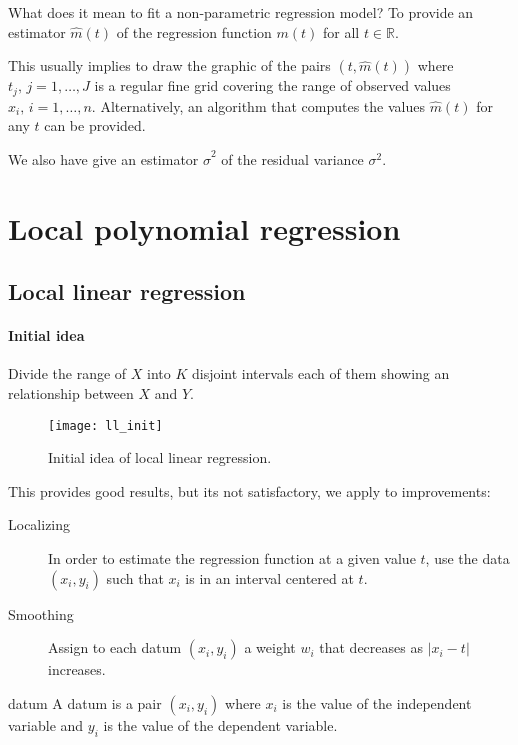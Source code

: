 \begin{question}{What does it mean to fit a non-parametric regression model?}{}
	To provide an estimator $\hat{m}(t)$ of the regression function $m(t)$ for
	all $t \in \mathbb{R}$.

	This usually implies to draw the graphic of the pairs $(t, \hat{m}(t))$ where
	$t_j,\, j=1,\ldots,J$ is a regular fine grid covering the range of observed values
	$x_i,\, i=1,\ldots,n$.
	Alternatively, an algorithm that computes the values $\hat{m}(t)$ for any $t$
	can be provided.

	We also have give an estimator $\hat\sigma^2$ of the residual variance $\sigma^2$.
\end{question}

\pagebreak
\section{Local polynomial regression}
\subsection{Local linear regression}

\paragraph{Initial idea} Divide the range of $X$ into $K$ disjoint intervals
each of them showing an  relationship between $X$ and $Y$.
\begin{figure}[H]
	\texttt{[image: ll\_init]}
	\caption{Initial idea of local linear regression.}
\end{figure}

This provides good results, but its not satisfactory, we apply to improvements:
\begin{description}
	\item[Localizing] In order to estimate the regression function at a given value $t$,
		use the data $(x_i, y_i)$ such that $x_i$ is in an interval centered at $t$.
	\item[Smoothing] Assign to each datum $(x_i, y_i)$ a weight $w_i$ that decreases
		as $|x_i - t|$ increases.
\end{description}

\begin{definition}{datum}{}
	A datum is a pair $(x_i, y_i)$ where $x_i$ is the value of the independent
	variable and $y_i$ is the value of the dependent variable.
\end{definition}

